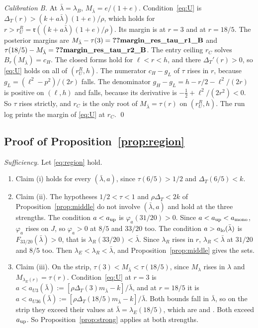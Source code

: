 \documentclass[12pt]{article}
\theoremstyle{definition}
\theoremstyle{remark}
\newcommand{\fr}{\mathfrak r}
\newcommand{\DT}{\Delta_T}
\newcommand{\lb}{\bar\lambda}
\begin{document}
\emph{Calibration B.} At $\lb=\lambda_B$, $M_{\lb}=e/(1+e)$. Condition~\eqref{eq:U} is
$\DT(r)>(k+a\lb)(1+e)/\rho$, which holds for $r>r_U^R=\fr((k+a\lb)(1+e)/\rho)$. Its margin is
 at $r=3$ and  at $r=18/5$. The posterior margins are
$M_{\lb}-\tau(3)=\reg{margin_res_tau_r1_B}$ and $\tau(18/5)-M_{\lb}=\reg{margin_res_tau_r2_B}$. The entry ceiling
$r_C$ solves $B_r(M_{\lb})=c_H$. The closed forms hold for $\ell<r<h$, and there $\DT'(r)>0$, so \eqref{eq:U}
holds on all of $(r_U^R,h)$. The numerator $c_H-g_L$ of $\tau$ rises in $r$, because $g_L=(\ell^2-p^2)/(2r)$ falls.
The denominator $g_H-g_L=h-r/2-\ell^2/(2r)$ is positive on $(\ell,h)$ and falls, because its derivative is
$-\frac12+\ell^2/(2r^2)<0$. So $\tau$ rises strictly, and $r_C$ is the only root of $M_{\lb}=\tau(r)$ on $(r_U^R,h)$.
The run log prints the margin of \eqref{eq:U} at $r_C$. \qed

\subsection{Proof of Proposition~\ref{prop:region}}

\emph{Sufficiency.} Let \eqref{eq:region} hold.
\begin{enumerate}[nosep]
\item Claim (i) holds for every $(\lb,a)$, since $\tau(6/5)>1/2$ and $\DT(6/5)<k$.
\item Claim (ii). The hypotheses $1/2<\tau<1$ and $\rho\DT<2k$ of Proposition~\ref{prop:middle} do not involve
  $(\lb,a)$ and hold at the three strengths. The condition $a<a_{\rm up}$ is $\varphi_a(31/20)>0$. Since
  $a<a_{\rm up}<a_{\rm mono}$, $\varphi_a$ rises on $J$, so $\varphi_a>0$ at $8/5$ and $33/20$ too. The condition
  $a>a_{\rm lo}(\lb)$ is $F_{33/20}(\lb)>0$, that is $\lambda_R(33/20)<\lb$. Since $\lambda_R$ rises in $r$,
  $\lambda_R<\lb$ at $31/20$ and $8/5$ too. Then $\lambda_E<\lambda_R<\lb$, and Proposition~\ref{prop:middle} gives the
  sets.
\item Claim (iii). On the strip, $\tau(3)<M_{\lb}<\tau(18/5)$, since $M_\lambda$ rises in $\lambda$ and
  $M_{\lambda_E(r)}=\tau(r)$. Condition~\eqref{eq:U} at $r=3$ is $a<a_{U3}(\lb):=[\rho\DT(3)m_{\lb}-k]/\lb$, and at
  $r=18/5$ it is $a<a_{U36}(\lb):=[\rho\DT(18/5)m_{\lb}-k]/\lb$. Both bounds fall in $\lb$, so on the strip they
  exceed their values at $\lb=\lambda_E(18/5)$, which are  and . Both
  exceed $a_{\rm up}$. So Proposition~\ref{prop:strong} applies at both strengths.
\end{enumerate}
\end{document}
